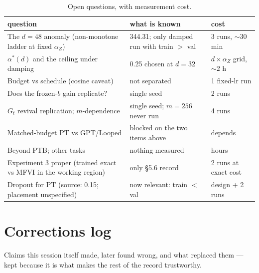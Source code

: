 \documentclass[10pt,a4paper]{article}
\begin{document}
\begin{table}[h]\centering\footnotesize
\caption{Open questions, with measurement cost.}
\begin{tabular}{p{7.8cm}p{4.6cm}l}
\toprule
question & what is known & cost\\
\midrule
The $d{=}48$ anomaly (non-monotone ladder at fixed $\alpha_Z$) & 344.31; only damped run with train $>$ val & 3 runs, ${\sim}30$ min\\
$\alpha^{*}(d)$ and the ceiling under damping & 0.25 chosen at $d{=}32$ & $d\times\alpha_Z$ grid, ${\sim}2$ h\\
Budget vs schedule (cosine caveat) & not separated & 1 fixed-lr run\\
Does the frozen-$b$ gain replicate? & single seed & 2 runs\\
$G_t$ revival replication; $m$-dependence & single seed; $m{=}256$ never run & 4 runs\\
Matched-budget PT vs GPT/Looped & blocked on the two items above & depends\\
Beyond PTB; other tasks & nothing measured & hours\\
Experiment 3 proper (trained exact vs MFVI in the working region) & only \S5.6 record & 2 runs at exact cost\\
Dropout for PT (source: 0.15; placement unspecified) & now relevant: train $<$ val & design + 2 runs\\
\bottomrule
\end{tabular}
\end{table}

\section{Corrections log}\label{sec:corr}

Claims this session itself made, later found wrong, and what replaced them --- kept because
it is what makes the rest of the record trustworthy.
\end{document}
